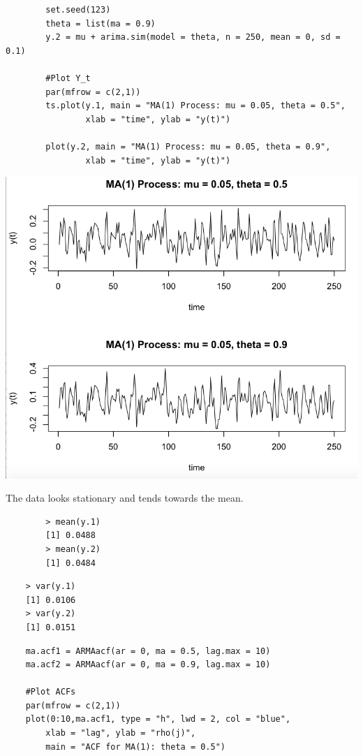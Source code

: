 \documentclass[letterpaper,12pt]{article}
\begin{document}
\begin{enumerate}
\begin{lstlisting}
        set.seed(123)
        theta = list(ma = 0.9)
        y.2 = mu + arima.sim(model = theta, n = 250, mean = 0, sd = 0.1)
        
        #Plot Y_t
        par(mfrow = c(2,1))
        ts.plot(y.1, main = "MA(1) Process: mu = 0.05, theta = 0.5", 
        		xlab = "time", ylab = "y(t)")
        
        plot(y.2, main = "MA(1) Process: mu = 0.05, theta = 0.9", 
        		xlab = "time", ylab = "y(t)")
\end{lstlisting}
\includegraphics[scale = 0.5]{ma1}

The data looks stationary and tends towards the mean.

\begin{lstlisting}
        > mean(y.1)
        [1] 0.0488
        > mean(y.2)
        [1] 0.0484
\end{lstlisting}

\begin{lstlisting}
	> var(y.1)
	[1] 0.0106
	> var(y.2)
	[1] 0.0151
\end{lstlisting}

	\begin{lstlisting}
	ma.acf1 = ARMAacf(ar = 0, ma = 0.5, lag.max = 10)
	ma.acf2 = ARMAacf(ar = 0, ma = 0.9, lag.max = 10)

	#Plot ACFs
	par(mfrow = c(2,1))
	plot(0:10,ma.acf1, type = "h", lwd = 2, col = "blue", 
		xlab = "lag", ylab = "rho(j)", 
		main = "ACF for MA(1): theta = 0.5")


\end{lstlisting}
\end{enumerate}
\end{document}
